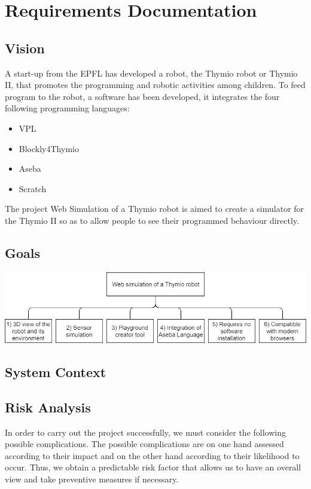 \documentclass{scrartcl}
\begin{document}
\section{Requirements Documentation}
\subsection{Vision}

A start-up from the EPFL has developed a robot, the Thymio robot or Thymio II, that promotes the programming and robotic activities among children. 
To feed program to the robot, a software has been developed, it integrates the four following programming languages: 
\begin{itemize}
  \item VPL
  \item Blockly4Thymio
  \item Aseba
  \item Scratch
\end{itemize}

The project Web Simulation of a Thymio robot is aimed to create a simulator for the Thymio II so as to allow people to see their programmed behaviour directly.

\subsection{Goals}
\begin{center}
  \includegraphics[width=\textwidth]{./goals}
\end{center}

\subsection{System Context}
\subsection{Risk Analysis}
In order to carry out the project successfully, we must consider the following possible complications. The possible complications are on one hand assessed according to their impact and on the other hand according to their likelihood to occur. 
Thus, we obtain a predictable risk factor that allows us to have an overall view and take preventive measures if necessary.
\end{document}

